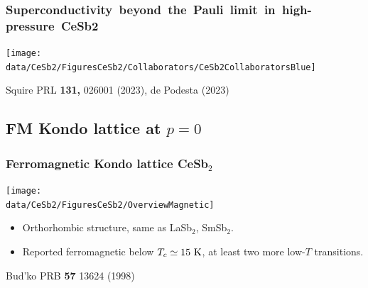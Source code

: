 


\begin{frame}[plain,label=CeSb2Grouplist]
    \frametitle {\mbox{Superconductivity beyond the Pauli limit in high-pressure CeSb2}}
    \texttt{[image: \\data/CeSb2/FiguresCeSb2/Collaborators/CeSb2CollaboratorsBlue]}
    \vfill
\centerline{\makebox[\linewidth]{\rule{0.85\textwidth}{0.4pt}}}

\centerline{\scriptsize Squire PRL {\bf 131,} 026001 (2023), de Podesta (2023)}

\end{frame}
    
     


\subsection{FM Kondo lattice at $p=0$}
\begin{frame}[label=CeSb2Intro]
\frametitle{Ferromagnetic Kondo lattice CeSb$_2$}
\centerline{\texttt{[image: \\data/CeSb2/FiguresCeSb2/OverviewMagnetic]}}

\vspace{1.5em}
\begin{itemize}
\item Orthorhombic structure, same as LaSb$_2$, SmSb$_2$.

\item Reported ferromagnetic below $T_c \simeq 15~\rm K$, at least two more low-$T$ transitions.
%
\end{itemize}

\vspace{3 em}
\centerline{\makebox[\linewidth]{\rule{0.85\textwidth}{0.4pt}}}

\centerline{\scriptsize Bud'ko PRB {\bf 57} 13624 (1998)}
\end{frame}


